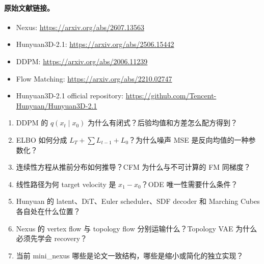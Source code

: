 \documentclass[11pt,a4paper]{ctexart}
\begin{document}
\paragraph{原始文献链接。}
\begin{itemize}
\item Nexus: \url{https://arxiv.org/abs/2607.13563}
\item Hunyuan3D-2.1: \url{https://arxiv.org/abs/2506.15442}
\item DDPM: \url{https://arxiv.org/abs/2006.11239}
\item Flow Matching: \url{https://arxiv.org/abs/2210.02747}
\item Hunyuan3D-2.1 official repository: \url{https://github.com/Tencent-Hunyuan/Hunyuan3D-2.1}
\end{itemize}

\begin{claimbox}[读完后应能独立回答]
\begin{enumerate}
\item DDPM 的 $q(x_t\mid x_0)$ 为什么有闭式？后验均值和方差怎么配方得到？
\item ELBO 如何分成 $L_T+\sum L_{t-1}+L_0$？为什么噪声 MSE 是反向均值的一种参数化？
\item 连续性方程从推前分布如何推导？CFM 为什么与不可计算的 FM 同梯度？
\item 线性路径为何 target velocity 是 $x_1-x_0$？ODE 唯一性需要什么条件？
\item Hunyuan 的 latent、DiT、Euler scheduler、SDF decoder 和 Marching Cubes 各自处在什么位置？
\item Nexus 的 vertex flow 与 topology flow 分别运输什么？Topology VAE 为什么必须先学会 recovery？
\item 当前 mini\_nexus 哪些是论文一致结构，哪些是缩小或简化的独立实现？
\end{enumerate}
\end{claimbox}
\end{document}
